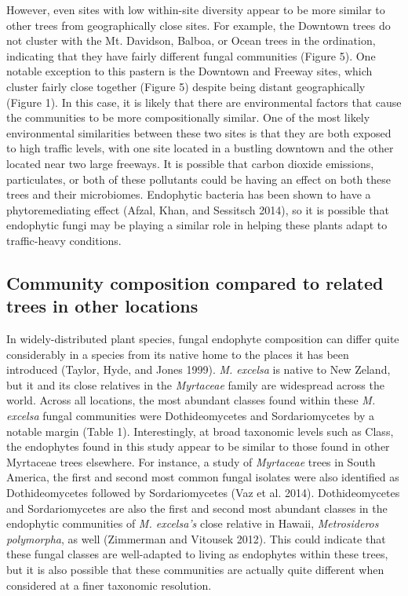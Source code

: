 \documentclass[fleqn,10pt,lineno]{wlpeerj} %
\begin{document}
However, even sites with low within-site diversity appear to be more
similar to other trees from geographically close sites. For example, the
Downtown trees do not cluster with the Mt. Davidson, Balboa, or Ocean
trees in the ordination, indicating that they have fairly different
fungal communities (Figure 5). One notable exception to this pastern is
the Downtown and Freeway sites, which cluster fairly close together
(Figure 5) despite being distant geographically (Figure 1). In this
case, it is likely that there are environmental factors that cause the
communities to be more compositionally similar. One of the most likely
environmental similarities between these two sites is that they are both
exposed to high traffic levels, with one site located in a bustling
downtown and the other located near two large freeways. It is possible
that carbon dioxide emissions, particulates, or both of these pollutants
could be having an effect on both these trees and their microbiomes.
Endophytic bacteria has been shown to have a phytoremediating effect
(Afzal, Khan, and Sessitsch 2014), so it is possible that endophytic
fungi may be playing a similar role in helping these plants adapt to
traffic-heavy conditions.

\hypertarget{community-composition-compared-to-related-trees-in-other-locations}{%
\subsection{Community composition compared to related trees in other
locations}\label{community-composition-compared-to-related-trees-in-other-locations}}

In widely-distributed plant species, fungal endophyte composition can
differ quite considerably in a species from its native home to the
places it has been introduced (Taylor, Hyde, and Jones 1999). \emph{M.
excelsa} is native to New Zeland, but it and its close relatives in the
\emph{Myrtaceae} family are widespread across the world. Across all
locations, the most abundant classes found within these \emph{M.
excelsa} fungal communities were Dothideomycetes and Sordariomycetes by
a notable margin (Table 1). Interestingly, at broad taxonomic levels
such as Class, the endophytes found in this study appear to be similar
to those found in other Myrtaceae trees elsewhere. For instance, a study
of \emph{Myrtaceae} trees in South America, the first and second most
common fungal isolates were also identified as Dothideomycetes followed
by Sordariomycetes (Vaz et al. 2014). Dothideomycetes and
Sordariomycetes are also the first and second most abundant classes in
the endophytic communities of \emph{M. excelsa's} close relative in
Hawaii, \emph{Metrosideros polymorpha}, as well (Zimmerman and Vitousek
2012). This could indicate that these fungal classes are well-adapted to
living as endophytes within these trees, but it is also possible that
these communities are actually quite different when considered at a
finer taxonomic resolution.
\end{document}
